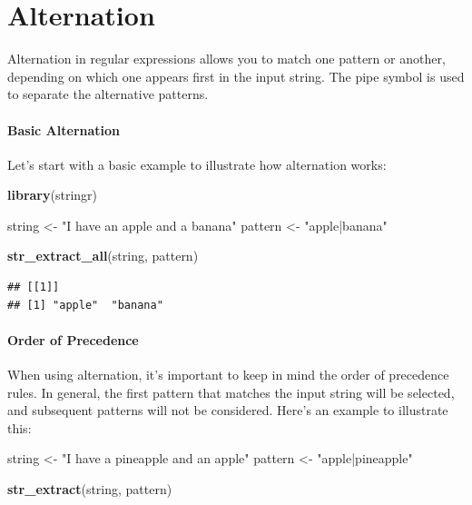\documentclass[
]{book}
\newenvironment{Shaded}{\begin{snugshade}}{\end{snugshade}}
\newcommand{\FunctionTok}[1]{\textcolor[rgb]{0.13,0.29,0.53}{\textbf{#1}}}
\newcommand{\NormalTok}[1]{#1}
\newcommand{\OtherTok}[1]{\textcolor[rgb]{0.56,0.35,0.01}{#1}}
\newcommand{\StringTok}[1]{\textcolor[rgb]{0.31,0.60,0.02}{#1}}
\begin{document}
\hypertarget{alternation}{%
\section{Alternation}\label{alternation}}

Alternation in regular expressions allows you to match one pattern or another, depending on which one appears first in the input string. The pipe symbol \texttt{\textbar{}} is used to separate the alternative patterns.

\hypertarget{basic-alternation}{%
\paragraph{Basic Alternation}\label{basic-alternation}}

Let's start with a basic example to illustrate how alternation works:

\begin{Shaded}
\begin{Highlighting}[]
\FunctionTok{library}\NormalTok{(stringr)}

\NormalTok{string }\OtherTok{\textless{}{-}} \StringTok{"I have an apple and a banana"}
\NormalTok{pattern }\OtherTok{\textless{}{-}} \StringTok{"apple|banana"}

\FunctionTok{str\_extract\_all}\NormalTok{(string, pattern)}
\end{Highlighting}
\end{Shaded}

\begin{verbatim}
## [[1]]
## [1] "apple"  "banana"
\end{verbatim}

\hypertarget{order-of-precedence}{%
\paragraph{Order of Precedence}\label{order-of-precedence}}

When using alternation, it's important to keep in mind the order of precedence rules. In general, the first pattern that matches the input string will be selected, and subsequent patterns will not be considered. Here's an example to illustrate this:

\begin{Shaded}
\begin{Highlighting}[]
\NormalTok{string }\OtherTok{\textless{}{-}} \StringTok{"I have a pineapple and an apple"}
\NormalTok{pattern }\OtherTok{\textless{}{-}} \StringTok{"apple|pineapple"}

\FunctionTok{str\_extract}\NormalTok{(string, pattern)}
\end{Highlighting}
\end{Shaded}
\end{document}
